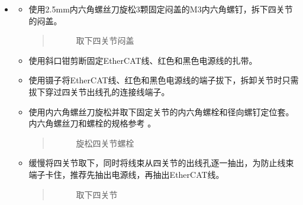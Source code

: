 \documentclass[a4paper,11pt,english,openany,oneside]{sphinxmanual}
\begin{document}
\begin{itemize}
\begin{itemize}
\end{itemize}

\item {} 
\sphinxAtStartPar
{}
\begin{itemize}
\item {} 
\sphinxAtStartPar
使用2.5mm内六角螺丝刀旋松3颗固定闷盖的M3内六角螺钉，拆下四关节的闷盖。
\begin{quote}

\begin{figure}[H]
\centering
\capstart

\noindent{}
\caption{取下四关节闷盖}\label{\detokenize{_u66f4_u6362_u5173_u8282:id78}}\end{figure}
\end{quote}

\item {} 
\sphinxAtStartPar
使用斜口钳剪断固定EtherCAT线、红色和黑色电源线的扎带。

\item {} 
\sphinxAtStartPar
使用镊子将EtherCAT线、红色和黑色电源线的端子拔下，拆卸关节时只需拔下穿过四关节出线孔的连接线端子。

\item {} 
\sphinxAtStartPar
使用内六角螺丝刀旋松并取下固定关节的内六角螺栓和径向螺钉定位套。内六角螺丝刀和螺栓的规格参考 {\hyperref[\detokenize{_u66f4_u6362_u5173_u8282:id9}]{}} 。
\begin{quote}

\begin{figure}[H]
\centering
\capstart

\noindent{}
\caption{旋松四关节螺栓}\label{\detokenize{_u66f4_u6362_u5173_u8282:id79}}\end{figure}
\end{quote}

\item {} 
\sphinxAtStartPar
缓慢将四关节取下，同时将线束从四关节的出线孔逐一抽出，为防止线束端子卡住，推荐先抽出电源线，再抽出EtherCAT线。
\begin{quote}

\begin{figure}[H]
\centering
\capstart

\noindent{}
\caption{取下四关节}\label{\detokenize{_u66f4_u6362_u5173_u8282:id80}}\end{figure}
\end{quote}


\end{itemize}
\end{itemize}
\end{document}
